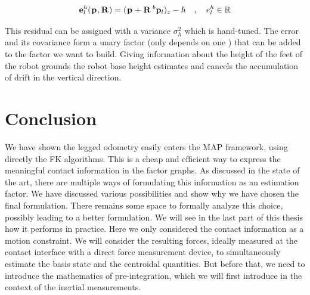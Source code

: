 \begin{equation}
    {\bf e}^h_l(\prescript{}{}{{\bf p}}_{}, \prescript{}{}{{\bf R}}_{}) = (\prescript{}{}{{\bf p}}_{} + \prescript{}{}{{\bf R}}_{} \prescript{b}{}{{\bf p}}_{l})_z - h \quad, \quad e^{h}_l \in \mathbb{R}
\end{equation}

This residual can be assigned with a variance $\sigma_h^2$ which is hand-tuned. 
The error and its covariance form a unary factor (only depends on one \keyframe) 
that can be added to the factor we want to build.
Giving information about the height of the feet of the robot grounds the robot base height estimates and cancels the accumulation of drift in the vertical direction.






\section{Conclusion}

We have shown the legged odometry easily enters the MAP framework, using directly
the FK algorithms. This is a cheap and efficient way to express the meaningful contact
information in the factor graphs. As discussed in the state of the art, there are multiple
ways of formulating this information as an estimation factor. We have discussed
various possibilities and show why we have chosen the final formulation. There remains
some space to formally analyze this choice, possibly leading to a better formulation.
We will see in the last part of this thesis how it performs in practice.
Here we only considered the contact information as a motion constraint. We will
consider the resulting forces, ideally measured at the contact interface with a direct
force measurement device, to simultaneously estimate the basis state and the centroidal
quantities. But before that, we need to introduce the mathematics of pre-integration,
which we will first introduce in the context of the inertial measurements.
